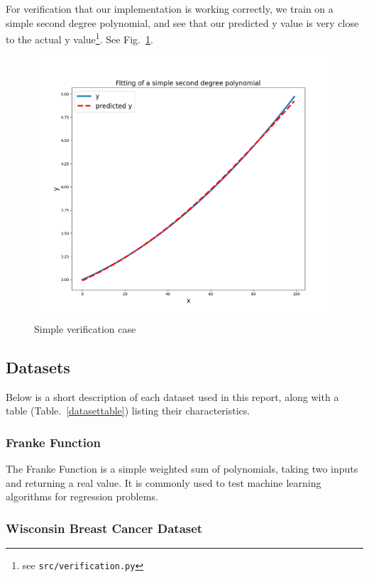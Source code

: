 \documentclass[onecolumn,10pt,cleanfoot]{asme2ej}
\begin{document}
For verification that our implementation is working correctly, we train on a simple second degree polynomial, and see that our predicted y value is very close to the actual y value\footnote{see \texttt{src/verification.py}}. See Fig.~\ref{verification}.

\begin{figure}[h]
\centerline{\includegraphics[width=5in]{figure/verification.png}}
\caption{Simple verification case}
\label{verification}
\end{figure}

\subsection{Datasets}

Below is a short description of each dataset used in this report, along with a table (Table.~\ref{datasettable}) listing their characteristics.

\subsubsection{Franke Function}

The Franke Function is a simple weighted sum of polynomials, taking two inputs and returning a real value. It is commonly used to test machine learning algorithms for regression problems.

\subsubsection{Wisconsin Breast Cancer Dataset}
\end{document}
